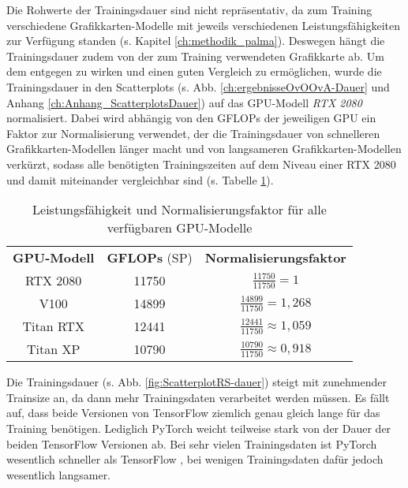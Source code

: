 Die Rohwerte der Trainingsdauer sind nicht repräsentativ, da zum Training verschiedene Grafikkarten-Modelle mit jeweils verschiedenen Leistungsfähigkeiten zur Verfügung standen (s. Kapitel \ref{ch:methodik_palma}). Deswegen hängt die Trainingsdauer zudem von der zum Training verwendeten Grafikkarte ab.
Um dem entgegen zu wirken und einen guten Vergleich zu ermöglichen, wurde die Trainingsdauer in den Scatterplots (s. Abb. \ref{ch:ergebnisseOvOOvA-Dauer} und Anhang \ref{ch:Anhang_ScatterplotsDauer}) auf das GPU-Modell \textit{RTX 2080} normalisiert. Dabei wird abhängig von den GFLOPs der jeweiligen GPU ein Faktor zur Normalisierung verwendet, der die Trainingsdauer von schnelleren Grafikkarten-Modellen länger macht und von langsameren Grafikkarten-Modellen verkürzt, sodass alle benötigten Trainingszeiten auf dem Niveau einer RTX 2080 und damit miteinander vergleichbar sind (s. Tabelle \ref{tab:GPUNormalisierung}).
\begin{table}[H]
\centering
\begin{tabular}{|c|c|c|}
\hline 
\multirow{2}{*}{\textbf{GPU-Modell}} & \multirow{2}{*}{\textbf{GFLOPs} (SP)} & \multirow{2}{*}{\textbf{Normalisierungsfaktor}}\\
& & \\
\hline 
\multirow{2}{*}{RTX 2080} & \multirow{2}{*}{11750} & \multirow{2}{*}{$\frac{11750}{11750}=1$} \\
& & \\
\hline 
\multirow{2}{*}{V100} & \multirow{2}{*}{14899} & \multirow{2}{*}{$\frac{14899}{11750}=1,268$} \\
& & \\
\hline 
\multirow{2}{*}{Titan RTX} & \multirow{2}{*}{12441} & \multirow{2}{*}{$\frac{12441}{11750} \approx 1,059$} \\
& & \\
\hline 
\multirow{2}{*}{Titan XP} & \multirow{2}{*}{10790} & \multirow{2}{*}{$\frac{10790}{11750}\approx 0,918$} \\
& & \\
\hline 
\end{tabular} 
\caption{Leistungsfähigkeit und Normalisierungsfaktor für alle verfügbaren GPU-Modelle \cite{palma2GPUs}}
\label{tab:GPUNormalisierung}
\end{table}

Die Trainingsdauer (s. Abb. \ref{fig:ScatterplotRS-dauer}) steigt mit zunehmender Trainsize an, da dann mehr Trainingsdaten verarbeitet werden müssen.
Es fällt auf, dass beide Versionen von TensorFlow \cite{tensorflow} ziemlich genau gleich lange für das Training benötigen. Lediglich PyTorch \cite{pytorch} weicht teilweise stark von der Dauer der beiden TensorFlow \cite{tensorflow} Versionen ab. Bei sehr vielen Trainingsdaten ist PyTorch \cite{pytorch} wesentlich schneller als TensorFlow \cite{tensorflow}, bei wenigen Trainingsdaten dafür jedoch wesentlich langsamer.

